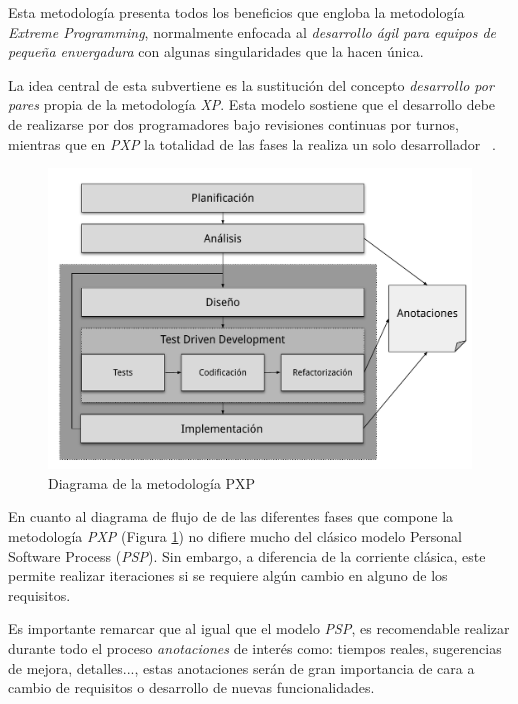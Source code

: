 Esta metodología presenta todos los beneficios que engloba la metodología \textit{Extreme Programming}, normalmente enfocada al \textit{desarrollo ágil para equipos de pequeña envergadura} con algunas
singularidades que la hacen única.

La idea central de esta subvertiene es la sustitución del concepto \textit{desarrollo por pares} propia de la metodología \textit{XP}. Esta modelo sostiene
que el desarrollo debe de realizarse por dos programadores bajo revisiones continuas por turnos, mientras que en \textit{PXP} la totalidad de las
fases la realiza un solo desarrollador ~\cite{inproceedings}.

\begin{figure}[H]
   \centering
   \includegraphics[scale=0.43]{images/pxpdiagram.pdf}
   \caption{Diagrama de la metodología PXP}
   \label{fig:pxpdiagram}
 \end{figure}

 En cuanto al diagrama de flujo de de las diferentes fases que compone
 la metodología \textit{PXP} (Figura \ref{fig:pxpdiagram}) no difiere mucho del clásico modelo 
 Personal Software Process (\textit{PSP}). Sin embargo, a diferencia de la corriente clásica, este permite realizar iteraciones
 si se requiere algún cambio en alguno de los requisitos.
 
 Es importante remarcar que al igual que el modelo \textit{PSP}, es recomendable realizar
 durante todo el proceso \textit{anotaciones} de interés como: tiempos reales,
 sugerencias de mejora, detalles..., estas anotaciones serán de gran importancia de cara
 a cambio de requisitos o desarrollo de nuevas funcionalidades.

